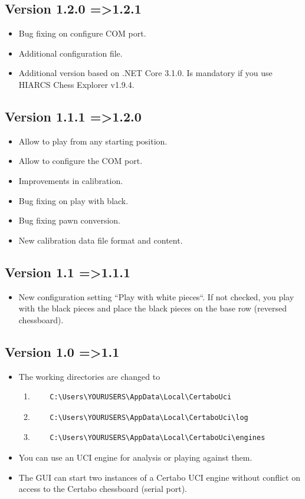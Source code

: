 \documentclass[11pt,a4paper]{article}
\begin{document}
\subsection{Version 1.2.0 =\textgreater 1.2.1}
\begin{itemize}
	\item Bug fixing on configure COM port.
	\item Additional configuration file.
	\item Additional version based on .NET Core 3.1.0. Is mandatory if you use HIARCS Chess Explorer v1.9.4.
\end{itemize}
\subsection{Version 1.1.1 =\textgreater 1.2.0}
\begin{itemize}
	\item Allow to play from any starting position.
	\item Allow to configure the COM port.
	\item Improvements in calibration.
	\item Bug fixing on play with black.
	\item Bug fixing pawn conversion.
	\item New calibration data file format and content.
\end{itemize}
\subsection{Version 1.1 =\textgreater 1.1.1}
\begin{itemize}
	\item New configuration setting ``Play with white pieces``. If not checked, you play with the black pieces and place the black pieces on the base row (reversed chessboard).
\end{itemize}
\subsection{Version 1.0 =\textgreater 1.1}
\begin{itemize}
	\item The working directories are changed to 
\begin{enumerate}
	\item \begin{verbatim}
	C:\Users\YOURUSERS\AppData\Local\CertaboUci
	\end{verbatim} 
	\item\begin{verbatim}
	C:\Users\YOURUSERS\AppData\Local\CertaboUci\log
	\end{verbatim} 
	\item \begin{verbatim}
	C:\Users\YOURUSERS\AppData\Local\CertaboUci\engines
	\end{verbatim} 	
\end{enumerate}
	\item You can use an UCI engine for analysis or playing against them.
	\item The GUI can start two instances of a Certabo UCI engine without conflict on access to the Certabo chessboard (serial port).
\end{itemize}
\end{document}
